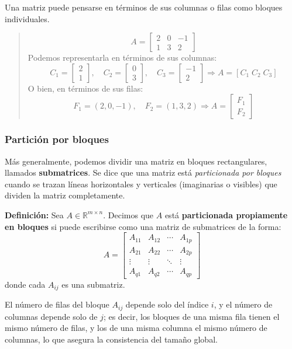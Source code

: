 Una matriz puede pensarse en términos de sus columnas o filas como bloques individuales.
\begin{quote}
  \[
  A = \begin{bmatrix}
  2 & 0 & -1\\
  1 & 3 & 2
  \end{bmatrix}
  \]
  Podemos representarla en términos de sus columnas:
  \[
  C_1 = \begin{bmatrix} 2 \\ 1 \end{bmatrix}, \quad
  C_2 = \begin{bmatrix} 0 \\ 3 \end{bmatrix}, \quad
  C_3 = \begin{bmatrix} -1 \\ 2 \end{bmatrix}
  \Rightarrow A = [C_1 \; C_2 \; C_3]
  \]
  O bien, en términos de sus filas:
  \[
  F_1 = \left(2, 0, -1\right), \quad
  F_2 = \left(1, 3, 2\right)
  \Rightarrow A = \begin{bmatrix} F_1 \\ F_2 \end{bmatrix}
  \]
\end{quote}

\subsubsection{Partición por bloques}

Más generalmente, podemos dividir una matriz en bloques rectangulares, llamados \textbf{submatrices}. Se dice que una matriz está \textit{particionada por bloques} cuando se trazan líneas horizontales y verticales (imaginarias o visibles) que dividen la matriz completamente.

\textbf{Definición:} Sea \(A \in \mathbb{R}^{m \times n}\). Decimos que \(A\) está \textbf{particionada propiamente en bloques} si puede escribirse como una matriz de submatrices de la forma:
\[
A = \begin{bmatrix}
A_{11} & A_{12} & \cdots & A_{1p} \\
A_{21} & A_{22} & \cdots & A_{2p} \\
\vdots & \vdots & \ddots & \vdots \\
A_{q1} & A_{q2} & \cdots & A_{qp}
\end{bmatrix}
\]
donde cada \(A_{ij}\) es una submatriz.  

El número de filas del bloque \(A_{ij}\) depende solo del índice \(i\), y el número de columnas depende solo de \(j\); es decir, los bloques de una misma fila tienen el mismo número de filas, y los de una misma columna el mismo número de columnas, lo que asegura la consistencia del tamaño global.

